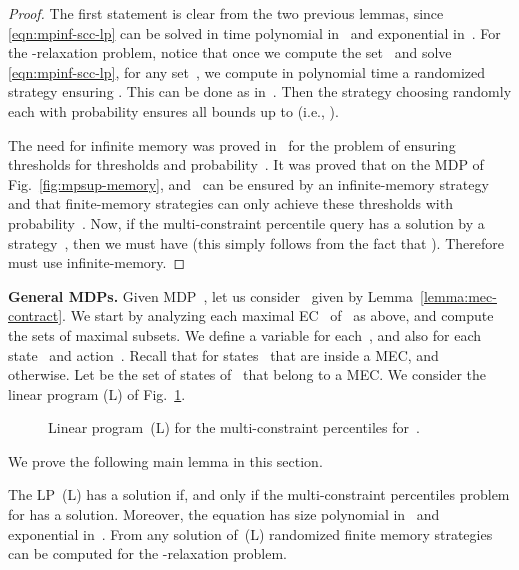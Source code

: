 \documentclass{llncs}
\begin{document}
\begin{proof}
  The first statement is clear from the two previous lemmas, since 
  \eqref{eqn:mpinf-scc-lp} can be solved in time polynomial in~ and exponential in~.
  For the -relaxation problem, notice that
  once we compute the set~ and solve \eqref{eqn:mpinf-scc-lp}, for any set~, we compute in polynomial time a randomized strategy  ensuring . This can be done 
  as in~\cite{BBCFK-lmcs14}. Then the strategy choosing randomly each  with probability   ensures all bounds up to  (i.e., ).

  The need for infinite memory was proved in~\cite[Section 5]{BBCFK-lmcs14} for the problem of
  ensuring thresholds  for thresholds  and probability~.
  It was proved that on the MDP of Fig.~\ref{fig:mpsup-memory},  and~ can be ensured by an infinite-memory strategy and that
  finite-memory strategies can only achieve these thresholds with probability~.
  Now, if the multi-constraint percentile query  
  has a solution by a strategy~, then we must have  (this simply follows from the fact that
  ). Therefore~ must use infinite-memory.  
\end{proof}

\smallskip\noindent\textbf{General MDPs.} Given MDP~, let us consider~ given by Lemma~\ref{lemma:mec-contract}.
We start by analyzing each maximal EC~ of~ as above, and compute the sets  of maximal subsets.
We define a variable  for each~, and also  for each state~ and action~. Recall that
 for states~ that are inside a MEC, and~ otherwise.
Let  be the set of states of~ that belong to a MEC.
We consider the linear program (L) of Fig.~\ref{fig:mpinf-lp}.

\vspace{-5mm}
\begin{figure}[th]
	\small
  
\vspace{-2mm}
  \caption{Linear program~(L) for the multi-constraint percentiles for~.}
  \label{fig:mpinf-lp}
\end{figure}
\vspace{-3mm}

We prove the following main lemma in this section.

\begin{lemma}
  \label{lemma:mpinf-lp}
  The LP~(L) has a solution if, and only if the multi-constraint percentiles problem for  has a solution. Moreover, the equation has size polynomial in~ and exponential in~.
  From any solution of~(L) randomized finite memory strategies can be computed for the -relaxation problem.
\end{lemma}
\end{document}
